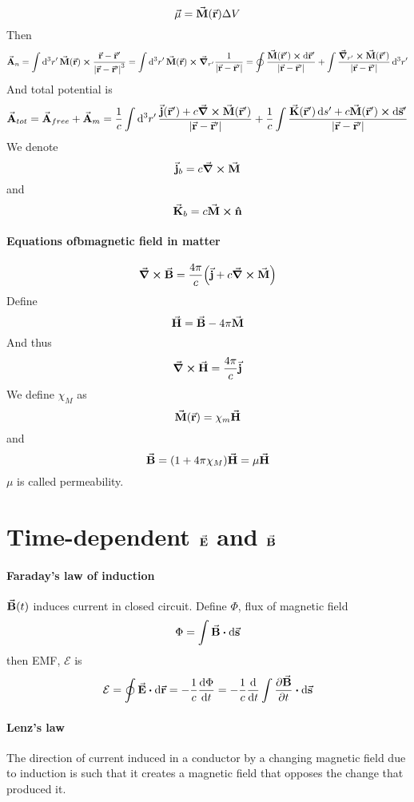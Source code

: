 $$\va{\mu} = \va{M}(\va{r}) \Delta V$$
Then
$$\va{A}_n = \int \dd[3]{r'}\va{M}(\va{r}) \cross \frac{\va{r}-\va{r}'}{\abs{\va{r}-\va{r}'}^3} = \int \dd[3]{r'}\va{M}(\va{r}) \cross \grad_{r'} \frac{1}{\abs{\va{r}-\va{r}'}} = \oint \frac{\va{M}(\va{r}') \cross \dd{\va{r}'}}{\abs{\va{r}-\va{r}'}} + \int \frac{\grad_{r'}\cross \va{M}(\va{r}')}{\abs{\va{r}-\va{r}'}} \dd[3]{r'}$$
And total potential is
$$\va{A}_{tot} = \va{A}_{free} + \va{A}_{m} = \frac{1}{c} \int \dd[3]{r'} \frac{\va{j}(\va{r}') + c \curl{\va{M}(\va{r}')}}{\abs{\va{r}-\va{r}'}} + \frac{1}{c} \int \frac{\va{K}(\va{r}')\dd{s'} + c\va{M}(\va{r}') \cross \dd{\va{s}'}}{\abs{\va{r}-\va{r}'}}$$
We denote
$$\va{j}_b = c \curl{\va{M}}$$
and
$$\va{K}_b = c\va{M} \cross \vu{n}$$
\paragraph{Equations ofbmagnetic field in matter}
$$\curl{\va{B}} = \frac{4\pi}{c} \qty(\va{j} + c\curl{\va{M}})$$
Define
$$\va{H} = \va{B} - 4\pi \va{M}$$
And thus
$$\curl{\va{H}} = \frac{4\pi}{c} \va{j}$$
We define $\chi_M$ as
$$\va{M}(\va{r}) = \chi_m \va{H}$$
and
$$\va{B}= (1+4\pi \chi_M) \va{H} = \mu \va{H}$$
$\mu$ is called permeability.

\section{Time-dependent $\va{E}$ and $\va{B}$ }
\paragraph{Faraday's law of induction}
$\va{B}(t)$ induces current in closed circuit.
Define $\Phi$, flux of magnetic field
$$\Phi = \int \va{B} \vdot \dd{\va{s}}$$
then EMF, $\mathcal{E}$ is
$$\mathcal{E} = \oint \va{E} \vdot \dd{\va{r}} = -\frac{1}{c} \dv{\Phi}{t} =-\frac{1}{c} \dv{t} \int \pdv{\va{B}}{t} \vdot \dd{\va{s}}$$
\paragraph{Lenz's law}
The direction of current induced in a conductor by a changing magnetic field due to induction is such that it creates a magnetic field that opposes the change that produced it.

